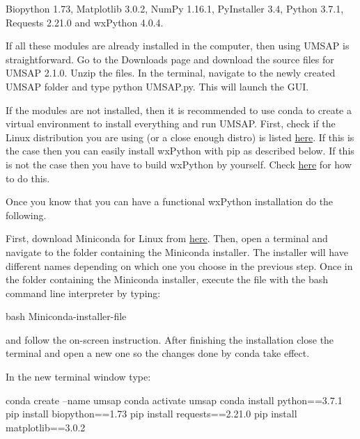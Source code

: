 Biopython \num{1.73}, Matplotlib \num[parse-numbers=false]{3.0.2}, NumPy \num[parse-numbers=false]{1.16.1}, PyInstaller \num{3.4}, Python \num[parse-numbers=false]{3.7.1}, Requests \num[parse-numbers=false]{2.21.0} and wxPython \num[parse-numbers=false]{4.0.4}.

If all these modules are already installed in the computer, then using UMSAP is straightforward. Go to the Downloads page and download the source files for UMSAP \num[parse-numbers=false]{2.1.0}.  Unzip the files. In the terminal, navigate to the newly created UMSAP folder and type python UMSAP.py. This will launch the GUI.

If the modules are not installed, then it is recommended to use conda to create a virtual environment to install everything and run UMSAP. First, check if the Linux distribution you are using (or a close enough distro) is listed \href{https://extras.wxpython.org/wxPython4/extras/linux/}{here}. If this is the case then you can easily install wxPython with pip as described below. If this is not the case then you have to build wxPython by yourself. Check \href{https://wxpython.org/blog/2017-08-17-builds-for-linux-with-pip/index.html}{here} for how to do this.

Once you know that you can have a functional wxPython installation do the following.

First, download Miniconda for Linux from \href{https://docs.conda.io/en/latest/miniconda.html}{here}. Then, open a terminal and navigate to the folder containing the Miniconda installer. The installer will have different names depending on which one you choose in the previous step. Once in the folder containing the Miniconda installer, execute the file with the bash command line interpreter by typing:

bash Miniconda-installer-file

and follow the on-screen instruction. After finishing the installation close the terminal and open a new one so the changes done by conda take effect.

In the new terminal window type:

conda create --name umsap
\newline
conda activate umsap
\newline
conda install python==3.7.1
\newline
pip install biopython==1.73
\newline
pip install requests==2.21.0
\newline
pip install matplotlib==3.0.2

